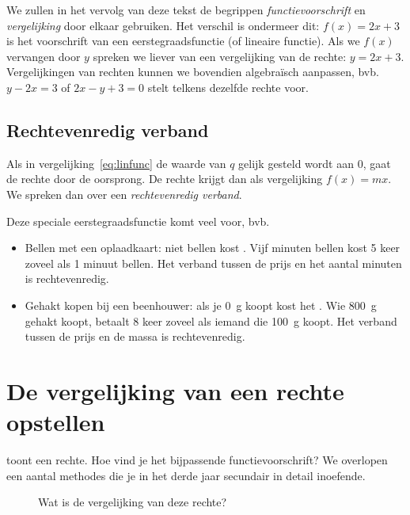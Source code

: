 We zullen in het vervolg van deze tekst de begrippen \emph{functievoorschrift} en \emph{vergelijking} door elkaar gebruiken. Het verschil is ondermeer dit: $f(x)=2x+3$ is het voorschrift van een eerstegraadsfunctie (of lineaire functie). Als we $f(x)$ vervangen door $y$ spreken we liever van een vergelijking van de rechte: $y=2x+3$. Vergelijkingen van rechten kunnen we bovendien algebraïsch aanpassen, bvb. $y-2x=3$ of $2x-y+3=0$ stelt telkens dezelfde rechte voor.

\subsection{Rechtevenredig verband}
Als in vergelijking~\eqref{eq:linfunc} de waarde van $q$ gelijk gesteld wordt aan 0, gaat de rechte door de oorsprong. De rechte krijgt dan als vergelijking $f(x)=mx$. We spreken dan over een \emph{rechtevenredig verband}.

Deze speciale eerstegraadsfunctie komt veel voor, bvb. 
\begin{itemize}
\item Bellen met een oplaadkaart: niet bellen kost . Vijf minuten bellen kost 5 keer zoveel als 1 minuut bellen. Het verband tussen de prijs en het aantal minuten is rechtevenredig.
\item Gehakt kopen bij een beenhouwer: als je \SI{0}{\gram} koopt kost het . Wie \SI{800}{\gram} gehakt koopt, betaalt 8 keer zoveel als iemand die \SI{100}{\gram} koopt.  Het verband tussen de prijs en de massa is rechtevenredig.
\end{itemize}

\section{De vergelijking van een rechte opstellen}
 toont een rechte. Hoe vind je het bijpassende functievoorschrift? We overlopen een aantal methodes die je in het derde jaar secundair in detail inoefende.
\begin{figure}[htbp]
    \centering
{}
\caption{Wat is de vergelijking van deze rechte?}
    \label{fig:rechtevgl}
\end{figure}

